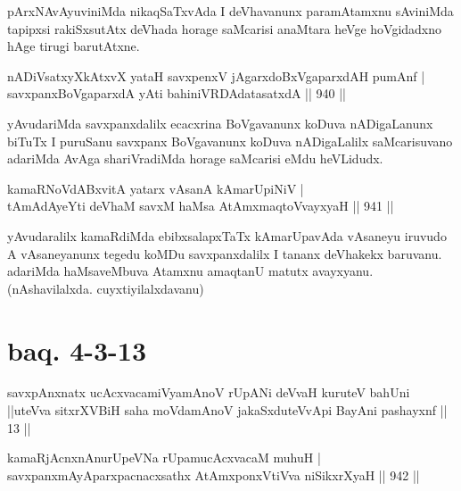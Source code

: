 \begin{artha}
pArxNAvAyuviniMda nikaqSaTxvAda I deVhavanunx paramAtamxnu sAviniMda tapipxsi rakiSxsutAtx deVhada horage saMcarisi anaMtara heVge hoVgidadxno hAge tirugi barutAtxne.
\end{artha}


\begin{shl}
nADiVsatxyXkAtxvX yataH savxpenxV jAgarxdoBxVgaparxdAH pumAnf | \\
savxpanxBoVgaparxdA yAti bahiniVRDAdatasatxdA \hfill||  940 ||  
\end{shl}

\begin{artha}
yAvudariMda savxpanxdalilx ecacxrina BoVgavanunx koDuva nADigaLanunx biTuTx I puruSanu savxpanx BoVgavanunx koDuva nADigaLalilx saMcarisuvano adariMda AvAga shariVradiMda horage saMcarisi eMdu heVLidudx.
\end{artha}

\begin{shl}
kamaRNoVdABxvitA yatarx vAsanA kAmarUpiNiV | \\
tAmAdAyeYti deVhaM savxM haMsa AtAmx\s maqtoV\s vayxyaH \hfill||  941 ||  
\end{shl}

\begin{artha}
yAvudaralilx kamaRdiMda ebibxsalapxTaTx kAmarUpavAda vAsaneyu iruvudo A vAsaneyanunx tegedu koMDu savxpanxdalilx I tananx deVhakekx baruvanu. adariMda haMsaveMbuva Atamxnu amaqtanU matutx avayxyanu. (nAshavilalxda. cuyxtiyilalxdavanu)
\end{artha}

\section*{baq. 4-3-13}

\begin{shl}
savxpAnxnatx ucAcxvacamiVyamAnoV rUpANi deVvaH kuruteV bahUni ||uteVva sitxrXVBiH saha moVdamAnoV jakaSxduteVvApi BayAni pashayxnf || 13 ||
\end{shl}


\begin{shl}
kamaRjAcnxnAnurUpeVNa rUpamucAcxvacaM muhuH | \\
savxpanxmAyAparxpacnacxsathx AtAmx\s \s ponxVtiVva niSikxrXyaH \hfill||  942 ||  
\end{shl}

